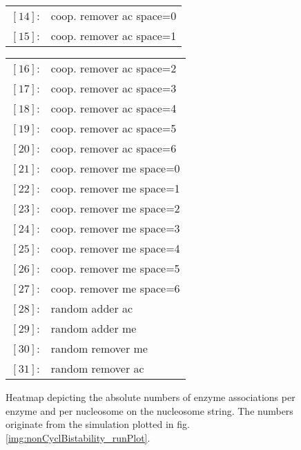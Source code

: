 \begin{figure}[htpb!]
\begin{center}
\begin{minipage}{.49\textwidth}
\begin{tabular}{l l}
                            $[14]$: & coop. remover ac space=0 \\
                            $[15]$: & coop. remover ac space=1 \\
                        \end{tabular}
                    \end{minipage}
                    \hfill
                    \begin{minipage}{.49\textwidth}
                        \begin{tabular}{l l}
                            $[16]$: & coop. remover ac space=2 \\
                            $[17]$: & coop. remover ac space=3 \\
                            $[18]$: & coop. remover ac space=4 \\
                            $[19]$: & coop. remover ac space=5 \\
                            $[20]$: & coop. remover ac space=6 \\\hline
                            $[21]$: & coop. remover me space=0 \\
                            $[22]$: & coop. remover me space=1 \\
                            $[23]$: & coop. remover me space=2 \\
                            $[24]$: & coop. remover me space=3 \\
                            $[25]$: & coop. remover me space=4 \\
                            $[26]$: & coop. remover me space=5 \\
                            $[27]$: & coop. remover me space=6 \\\hline
                            $[28]$: & random adder ac \\
                            $[29]$: & random adder me \\
                            $[30]$: & random remover me \\
                            $[31]$: & random remover ac \\
                            \hline \hline
                        \end{tabular}
                    \end{minipage}
                \end{center}

                \caption{Heatmap depicting the absolute numbers of enzyme associations per enzyme and per nucleosome on the nucleosome string. The numbers originate from the simulation plotted in fig. \ref{img:nonCyclBistability_runPlot}.}
                \label{img:nonCyclBistability_bindingNumbers}
            \end{figure}
